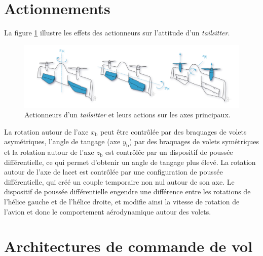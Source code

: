 \section{Actionnements}

La figure \ref{fig:actionDarko} illustre les effets des actionneurs sur l'attitude d'un \textit{tailsitter}.
\begin{figure}[ht!]
    \centerline{
    \includegraphics[trim=0cm 0cm 0cm 0cm,clip,width=1\columnwidth]{figures/actionnement.png}}
    \caption{Actionneurs d'un \textit{tailsitter} et leurs actions sur les axes principaux.}
    \label{fig:actionDarko}
\end{figure}

La rotation autour de l'axe $x_{\text{b}}$ peut être contrôlée par des braquages de volets asymétriques, l'angle de tangage (axe $y_{\text{b}}$) par des braquages de volets symétriques et la rotation autour de l'axe $z_{\text{b}}$ est contrôlée par un dispositif de poussée différentielle, ce qui permet d'obtenir un angle de tangage plus élevé. La rotation autour de l'axe de lacet est contrôlée par une configuration de poussée différentielle, qui créé un couple temporaire non nul autour de son axe. Le dispositif de poussée différentielle engendre une différence entre les rotations de l'hélice gauche et de l'hélice droite, et modifie ainsi la vitesse de rotation de l'avion et donc le comportement aérodynamique autour des volets.


\section{Architectures de commande de vol}


